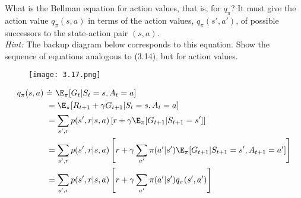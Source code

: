 
\begin{exercise}[Exercise 3.17]

What is the Bellman equation for action values, that is, for $q_\pi$? It must give
the action value $q_\pi(s,a)$ in terms of the action values, $q_\pi(s',a')$, of
possible successors to the state-action pair $(s,a)$. \\
\textit{Hint:} The backup diagram below corresponds to this equation.
Show the sequence of equations analogous to (3.14), but for action values.

\begin{figure}[H]
    \centering
    \texttt{[image: 3.17.png]}
\end{figure}

\end{exercise}


\begin{solution}

\begin{align*}
  q_\pi(s,a) \ &\dot = \ \E_\pi[G_t | S_t = s, A_t = a] \\
  &= \E_\pi[R_{t+1} +  \gamma G_{t+1} | S_t = s, A_t = a] \\
  &= \sum_{s',r} p(s',r|s,a)\left[r + \gamma \E_\pi[G_{t+1} | S_{t+1} = s']\right] \\
  &= \sum_{s',r} p(s',r|s,a)\left[r + \gamma \sum_{a'} \pi(a'|s')\E_\pi[G_{t+1} | S_{t+1} = s', A_{t+1} = a']\right] \\
  &= \sum_{s',r} p(s',r|s,a)\left[r + \gamma \sum_{a'} \pi(a'|s') q_\pi(s',a')\right] \\
\end{align*}

\end{solution}

